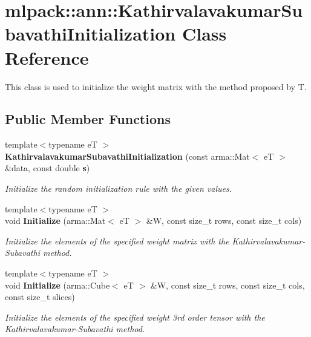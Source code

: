 \section{mlpack\+:\+:ann\+:\+:Kathirvalavakumar\+Subavathi\+Initialization Class Reference}
\label{classmlpack_1_1ann_1_1KathirvalavakumarSubavathiInitialization}


This class is used to initialize the weight matrix with the method proposed by T.  


\subsection*{Public Member Functions}
\begin{DoxyCompactItemize}
\item 
{\footnotesize template$<$typename eT $>$ }\\{\bf Kathirvalavakumar\+Subavathi\+Initialization} (const arma\+::\+Mat$<$ eT $>$ \&data, const double {\bf s})
\begin{DoxyCompactList}\small\item\em Initialize the random initialization rule with the given values. \end{DoxyCompactList}\item 
{\footnotesize template$<$typename eT $>$ }\\void {\bf Initialize} (arma\+::\+Mat$<$ eT $>$ \&W, const size\+\_\+t rows, const size\+\_\+t cols)
\begin{DoxyCompactList}\small\item\em Initialize the elements of the specified weight matrix with the Kathirvalavakumar-\/\+Subavathi method. \end{DoxyCompactList}\item 
{\footnotesize template$<$typename eT $>$ }\\void {\bf Initialize} (arma\+::\+Cube$<$ eT $>$ \&W, const size\+\_\+t rows, const size\+\_\+t cols, const size\+\_\+t slices)
\begin{DoxyCompactList}\small\item\em Initialize the elements of the specified weight 3rd order tensor with the Kathirvalavakumar-\/\+Subavathi method. \end{DoxyCompactList}\end{DoxyCompactItemize}
